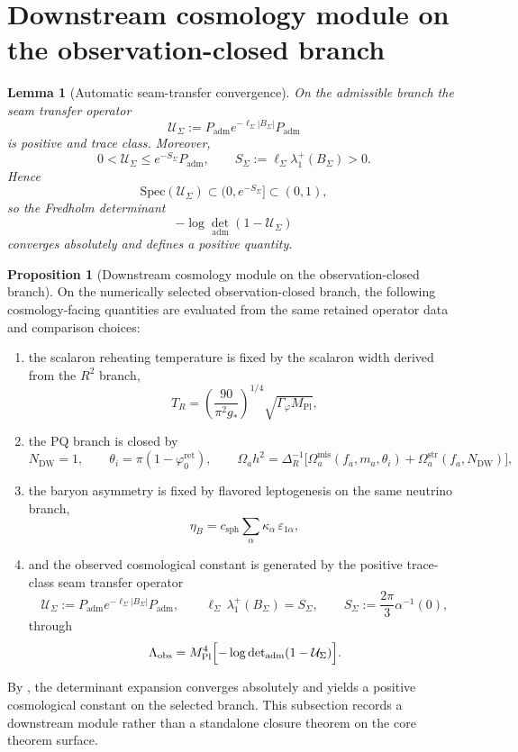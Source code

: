 \documentclass[11pt,a4paper]{article}
\newtheorem{lemma}[theorem]{Lemma}
\theoremstyle{definition}
\newtheorem{proposition}[theorem]{Proposition}
\theoremstyle{remark}
\newcommand{\Seam}{\Sigma}
\newcommand{\Mplunred}{M_{\mathrm{Pl}}}
\newcommand{\phiz}{\varphi_0^{\mathrm{ret}}}
\newcommand{\Padm}{P_{\mathrm{adm}}}
\begin{document}
\section{Downstream cosmology module on the observation-closed branch}
\label{sec:cosmology-closure}

\begin{lemma}[Automatic seam-transfer convergence]
\label{lem:automatic-seam-transfer-convergence}
On the admissible branch the seam transfer operator
\[
\mathcal U_\Seam:=\Padm e^{-\ell_\Seam|B_\Seam|}\Padm
\]
is positive and trace class. Moreover,
\[
0<\mathcal U_\Seam\le e^{-S_\Seam}\Padm,
\qquad
S_\Seam:=\ell_\Seam\lambda_1^+(B_\Seam)>0.
\]
Hence
\[
\mathrm{Spec}(\mathcal U_\Seam)\subset (0,e^{-S_\Seam}] \subset (0,1),
\]
so the Fredholm determinant
\[
-\log\det_{\mathrm{adm}}(1-\mathcal U_\Seam)
\]
converges absolutely and defines a positive quantity.
\end{lemma}

\begin{proposition}[Downstream cosmology module on the observation-closed branch]
\label{thm:cosmology-closure}
On the numerically selected observation-closed branch, the following cosmology-facing quantities
are evaluated from the same retained operator data and comparison choices:
\begin{enumerate}[label=(\roman*), leftmargin=1.5em, topsep=3pt, itemsep=2pt]
    \item the scalaron reheating temperature is fixed by the scalaron width derived from the
    $R^2$ branch,
    \[
    T_R=
    \left(\frac{90}{\pi^2 g_\ast}\right)^{1/4}
    \sqrt{\Gamma_\varphi \Mplunred},
    \]
    \item the PQ branch is closed by
    \[
    N_{\mathrm{DW}}=1,
    \qquad
    \theta_i=\pi(1-\phiz),
    \qquad
    \Omega_a h^2=
    \Delta_R^{-1}
    \bigl[
    \Omega_a^{\mathrm{mis}}(f_a,m_a,\theta_i)
    +
    \Omega_a^{\mathrm{str}}(f_a,N_{\mathrm{DW}})
    \bigr],
    \]
    \item the baryon asymmetry is fixed by flavored leptogenesis on the same neutrino branch,
    \[
    \eta_B=c_{\mathrm{sph}}\sum_\alpha \kappa_\alpha\,\varepsilon_{1\alpha},
    \]
    \item and the observed cosmological constant is generated by the positive trace-class seam
    transfer operator
    \[
    \mathcal U_\Seam:=\Padm e^{-\ell_\Seam |B_\Seam|}\Padm,
    \qquad
    \ell_\Seam\,\lambda_1^+(B_\Seam)=S_\Seam,
    \qquad
    S_\Seam:=\frac{2\pi}{3}\alpha^{-1}(0),
    \]
    through
    \[
    \Lambda_{\mathrm{obs}}
    =
    \Mplunred^4
    \Bigl[-\log\det\nolimits_{\mathrm{adm}}(1-\mathcal U_\Seam)\Bigr].
    \]
\end{enumerate}
By , the determinant expansion converges
absolutely and yields a positive cosmological constant on the selected branch. This subsection
records a downstream module rather than a standalone closure theorem on the core theorem surface.
\end{proposition}
\end{document}
